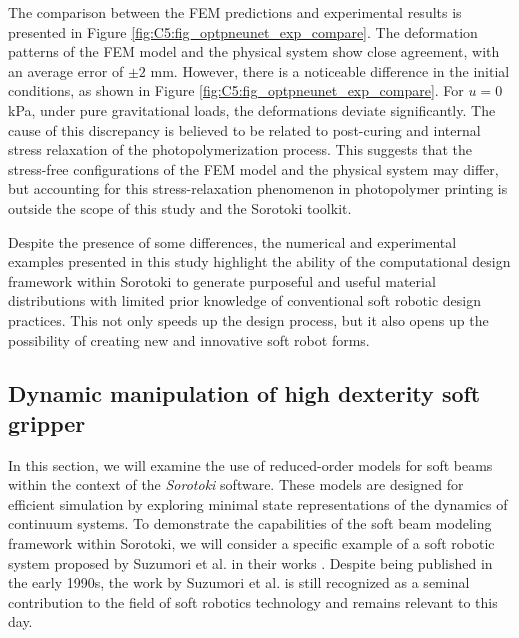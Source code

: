 The comparison between the FEM predictions and experimental results is presented in Figure \ref{fig:C5:fig_optpneunet_exp_compare}. The deformation patterns of the FEM model and the physical system show close agreement, with an average error of $\pm 2$ \si{\milli \meter}. However, there is a noticeable difference in the initial conditions, as shown in Figure \ref{fig:C5:fig_optpneunet_exp_compare}. For $u = 0$ \si{\kilo \pascal}, under pure gravitational loads, the deformations deviate significantly. The cause of this discrepancy is believed to be related to post-curing and internal stress relaxation of the photopolymerization process. This suggests that the stress-free configurations of the FEM model and the physical system may differ, but accounting for this stress-relaxation phenomenon in photopolymer printing is outside the scope of this study and the Sorotoki toolkit.

Despite the presence of some differences, the numerical and experimental examples presented in this study highlight the ability of the computational design framework within Sorotoki to generate purposeful and useful material distributions with limited prior knowledge of conventional soft robotic design practices. This not only speeds up the design process, but it also opens up the possibility of creating new and innovative soft robot forms.

\subsection{Dynamic manipulation of high dexterity soft gripper}
\label{sec:C5:suzumori_gripper}
In this section, we will examine the use of reduced-order models for soft beams within the context of the \textit{Sorotoki} software. These models are designed for efficient simulation by exploring minimal state representations of the dynamics of continuum systems. To demonstrate the capabilities of the soft beam modeling framework within Sorotoki, we will consider a specific example of a soft robotic system proposed by Suzumori et al. in their works \cite{Suzumori1991,Suzumori1992}. Despite being published in the early 1990s, the work by Suzumori et al. is still recognized as a seminal contribution to the field of soft robotics technology and remains relevant to this day.

